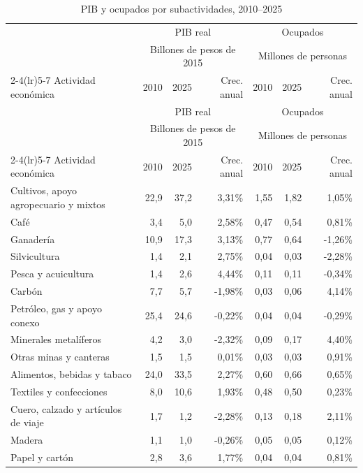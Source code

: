 \begingroup
\footnotesize
\begin{longtable}{p{}rrrrrr}
\caption{PIB y ocupados por subactividades, 2010--2025}\label{tab:pib_ocupados_61_comparable}\\
\toprule
& \multicolumn{3}{c}{PIB real} & \multicolumn{3}{c}{Ocupados} \\
& \multicolumn{3}{c}{\footnotesize Billones de pesos de 2015} & \multicolumn{3}{c}{\footnotesize Millones de personas} \\
\cmidrule(lr){2-4}\cmidrule(lr){5-7}
Actividad económica & 2010 & 2025 & Crec. anual & 2010 & 2025 & Crec. anual \\
\midrule
\endfirsthead
\toprule
& \multicolumn{3}{c}{PIB real} & \multicolumn{3}{c}{Ocupados} \\
& \multicolumn{3}{c}{\footnotesize Billones de pesos de 2015} & \multicolumn{3}{c}{\footnotesize Millones de personas} \\
\cmidrule(lr){2-4}\cmidrule(lr){5-7}
Actividad económica & 2010 & 2025 & Crec. anual & 2010 & 2025 & Crec. anual \\
\midrule
\endhead
Cultivos, apoyo agropecuario y mixtos & 22,9 & 37,2 & 3,31\% & 1,55 & 1,82 & 1,05\% \\
Café & 3,4 & 5,0 & 2,58\% & 0,47 & 0,54 & 0,81\% \\
Ganadería & 10,9 & 17,3 & 3,13\% & 0,77 & 0,64 & -1,26\% \\
Silvicultura & 1,4 & 2,1 & 2,75\% & 0,04 & 0,03 & -2,28\% \\
Pesca y acuicultura & 1,4 & 2,6 & 4,44\% & 0,11 & 0,11 & -0,34\% \\
Carbón & 7,7 & 5,7 & -1,98\% & 0,03 & 0,06 & 4,14\% \\
Petróleo, gas y apoyo conexo & 25,4 & 24,6 & -0,22\% & 0,04 & 0,04 & -0,29\% \\
Minerales metalíferos & 4,2 & 3,0 & -2,32\% & 0,09 & 0,17 & 4,40\% \\
Otras minas y canteras & 1,5 & 1,5 & 0,01\% & 0,03 & 0,03 & 0,91\% \\
Alimentos, bebidas y tabaco & 24,0 & 33,5 & 2,27\% & 0,60 & 0,66 & 0,65\% \\
Textiles y confecciones & 8,0 & 10,6 & 1,93\% & 0,48 & 0,50 & 0,23\% \\
Cuero, calzado y artículos de viaje & 1,7 & 1,2 & -2,28\% & 0,13 & 0,18 & 2,11\% \\
Madera & 1,1 & 1,0 & -0,26\% & 0,05 & 0,05 & 0,12\% \\
Papel y cartón & 2,8 & 3,6 & 1,77\% & 0,04 & 0,04 & 0,81\% \\

\end{longtable}
